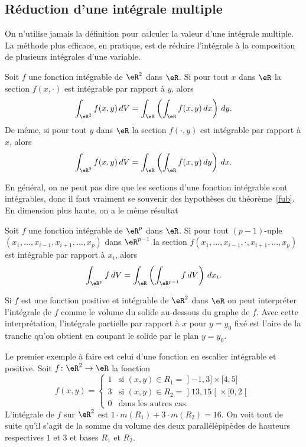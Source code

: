 \subsection{Réduction d'une intégrale multiple}
On n'utilise jamais la définition pour calculer la valeur d'une intégrale multiple. La méthode plus efficace, en pratique, est de réduire l'intégrale à la composition de plusieurs intégrales d'une variable.
\begin{theorem}[de Fubini]\label{fub}
 Soit $f$ une fonction intégrable de $\eR^2$ dans $\eR$. Si pour tout $x$ dans $\eR$ la section $f(x,\cdot)$ est intégrable par rapport à $y$, alors
\[
\int_{\eR^2}f(x,y)\,dV=\int_{\eR}\left(\int_{\eR}f(x,y)\,dx\right)\,dy.
\]
De même, si pour tout $y$ dans $\eR$ la section $f(\cdot, y)$ est intégrable par rapport à $x$, alors
\[
\int_{\eR^2}f(x,y)\,dV=\int_{\eR}\left(\int_{\eR}f(x,y)\,dy\right)\,dx.
\]
\end{theorem}		\label{ThoSectionINte}
En général, on ne peut pas dire que les sections d'une fonction intégrable sont intégrables, donc il faut vraiment se souvenir des hypothèses du théorème~\ref{fub}. En dimension plus haute, on a le même résultat
\begin{theorem}
 Soit $f$ une fonction intégrable de $\eR^p$ dans $\eR$. Si pour tout $(p-1)$-uple $(x_1,\ldots, x_{i-1},x_{i+1}, \ldots, x_p)$ dans $\eR^{p-1}$ la section $f(x_1,\ldots, x_{i-1},\cdot,x_{i+1}, \ldots, x_p)$ est intégrable par rapport à $x_i$, alors
\[
\int_{\eR^p}f \,dV=\int_{\eR}\left(\int_{\eR^{p-1}}f \,dV\right)\,dx_i.
\]
\end{theorem}

 Si $f$ est une fonction positive et intégrable de $\eR^2$ dans $\eR$ on peut interpréter l'intégrale de $f$ comme le volume du solide au-dessous du graphe de $f$.  Avec cette interprétation,  l'intégrale partielle par rapport à $x$ pour $y=y_0$ fixé est l'aire de la tranche qu'on obtient en coupant le solide par le plan $y=y_0$.

 \begin{example}
   Le premier exemple à faire est celui d'une fonction en escalier intégrable et positive. Soit $f\colon \eR^2\to \eR$ la fonction
\begin{equation}
	f(x,y)=\begin{cases}
		1	&	\text{si }(x,y)\in R_1=\mathopen] -1 , 3 \mathclose]\times\mathopen[ 4 , 5 \mathclose]\\
		3	&	 \text{si }(x,y)\in R_2=\mathopen] 13 , 15 \mathclose[\times\mathopen[ 0 , 2 \mathclose[\\
		0	&	 \text{dans les autres cas.}
	\end{cases}
\end{equation}
L'intégrale de $f$ sur $\eR^2$ est $1\cdot m(R_1)+ 3\cdot m(R_2)= 16$. On voit tout de suite qu'il s'agit de la somme du volume des deux parallélépipèdes de hauteurs respectives $1$ et $3$ et bases $R_1$ et $R_2$.
 \end{example}

